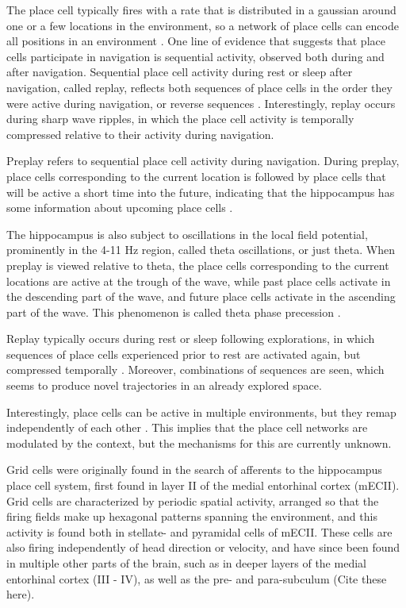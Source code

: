 \documentclass{article}
\begin{document}
    The place cell typically fires with a rate that is distributed in a gaussian around one or a few locations in the environment, so a network of place cells can encode all positions in an environment \parencite{Wilson1993}.
    One line of evidence that suggests that place cells participate in navigation is sequential activity, observed both during and after navigation. Sequential place cell activity during rest or sleep after navigation, called replay, reflects both sequences of place cells in the order they were active during navigation, or reverse sequences \parencite{Wilson1994}. Interestingly, replay occurs during sharp wave ripples, in which the place cell activity is temporally compressed relative to their activity during navigation.

    Preplay refers to sequential place cell activity during navigation. During preplay, place cells corresponding to the current location is followed by place cells that will be active a short time into the future, indicating that the hippocampus has some information about upcoming place cells \parencite{Dragoi2011,Dragoi2013}.

    The hippocampus is also subject to oscillations in the local field potential, prominently in the 4-11 Hz region, called theta oscillations, or just theta. When preplay is viewed relative to theta, the place cells corresponding to the current locations are active at the trough of the wave, while past place cells activate in the descending part of the wave, and future place cells activate in the ascending part of the wave. This phenomenon is called theta phase precession \parencite{OKeefe1993, Skaggs1996,Hafting2008}.

    Replay typically occurs during rest or sleep following explorations, in which sequences of place cells experienced prior to rest are activated again, but compressed temporally \parencite{Olafsdottir2016}. Moreover, combinations of sequences are seen, which seems to produce novel trajectories in an already explored space.

    Interestingly, place cells can be active in multiple environments, but they remap independently of each other \parencite{Muller1987}. This implies that the place cell networks are modulated by the context, but the mechanisms for this are currently unknown.

    Grid cells were originally found in the search of afferents to the hippocampus place cell system, first found in layer II of the medial entorhinal cortex (mECII)\parencite{Hafting2005}. Grid cells are characterized by periodic spatial activity, arranged so that the firing fields make up hexagonal patterns spanning the environment, and this activity is found both in stellate- and pyramidal cells of mECII\parencite{Rowland2018}. These cells are also firing independently of head direction or velocity, and have since been found in multiple other parts of the brain, such as in deeper layers of the medial entorhinal cortex (III - IV), as well as the pre- and para-subculum (Cite these here).
\end{document}
